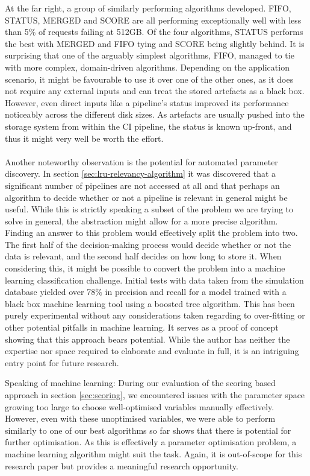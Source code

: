         At the far right, a group of similarly performing algorithms developed. FIFO, STATUS, MERGED and SCORE are all performing exceptionally well with less than 5\% of requests failing at 512GB. Of the four algorithms, STATUS performs the best with MERGED and FIFO tying and SCORE being slightly behind. It is surprising that one of the arguably simplest algorithms, FIFO, managed to tie with more complex, domain-driven algorithms. Depending on the application scenario, it might be favourable to use it over one of the other ones, as it does not require any external inputs and can treat the stored artefacts as a black box. However, even direct inputs like a pipeline's status improved its performance noticeably across the different disk sizes. As artefacts are usually pushed into the storage system from within the CI pipeline, the status is known up-front, and thus it might very well be worth the effort.\\ %
        \\\label{sec:machine-learning}
        Another noteworthy observation is the potential for automated parameter discovery. In section \ref{sec:lru-relevancy-algorithm} it was discovered that a significant number of pipelines are not accessed at all and that perhaps an algorithm to decide whether or not a pipeline is relevant in general might be useful. While this is strictly speaking a subset of the problem we are trying to solve in general, the abstraction might allow for a more precise algorithm. Finding an answer to this problem would effectively split the problem into two. The first half of the decision-making process would decide whether or not the data is relevant, and the second half decides on how long to store it. When considering this, it might be possible to convert the problem into a machine learning classification challenge. Initial tests with data taken from the simulation database yielded over 78\% in precision and recall for a model trained with a black box machine learning tool using a boosted tree algorithm. This has been purely experimental without any considerations taken regarding to over-fitting or other potential pitfalls in machine learning. It serves as a proof of concept showing that this approach bears potential. While the author has neither the expertise nor space required to elaborate and evaluate in full, it is an intriguing entry point for future research.
        
        Speaking of machine learning: During our evaluation of the scoring based approach in section \ref{sec:scoring}, we encountered issues with the parameter space growing too large to choose well-optimised variables manually effectively. However, even with these unoptimised variables, we were able to perform similarly to one of our best algorithms so far shows that there is potential for further optimisation. As this is effectively a parameter optimisation problem, a machine learning algorithm might suit the task. Again, it is out-of-scope for this research paper but provides a meaningful research opportunity.
